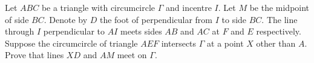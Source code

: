 Let $ABC$ be a triangle with circumcircle $\Gamma$ and incentre $I$. Let $M$ be the midpoint of side $BC$. Denote by $D$ the foot of perpendicular from $I$ to side $BC$. The line through $I$ perpendicular to $AI$ meets sides $AB$ and $AC$ at $F$ and $E$ respectively. Suppose the circumcircle of triangle $AEF$ intersects $\Gamma$ at a point $X$ other than $A$. Prove that lines $XD$ and $AM$ meet on $\Gamma$.
